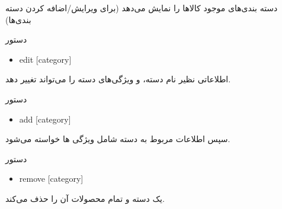 \documentclass[]{article}
\begin{document}
دسته بندی‌های موجود کالاها را نمایش می‌دهد (برای ویرایش/اضافه کردن دسته بندی‌ها)


\begin{mybox}[colback=brilliantlavender]{دستور}

\begin{latin}

\begin{itemize}[label = {$\Rightarrow$}]

\item
edit [category]

\end{itemize}

\end{latin}

\end{mybox}

اطلاعاتی نظیر نام دسته، و ویژگی‌های دسته را می‌تواند تغییر دهد.


\begin{mybox}[colback=brilliantlavender]{دستور}

\begin{latin}

\begin{itemize}[label = {$\Rightarrow$}]

\item
add [category]

\end{itemize}

\end{latin}

\end{mybox}

سپس اطلاعات مربوط به دسته شامل ویژگی ها خواسته می‌شود.

\begin{mybox}[colback=brilliantlavender]{دستور}

\begin{latin}

\begin{itemize}[label = {$\Rightarrow$}]

\item
remove [category]

\end{itemize}

\end{latin}

\end{mybox}

یک دسته و تمام محصولات آن را حذف می‌کند.

\newpage
\end{document}

